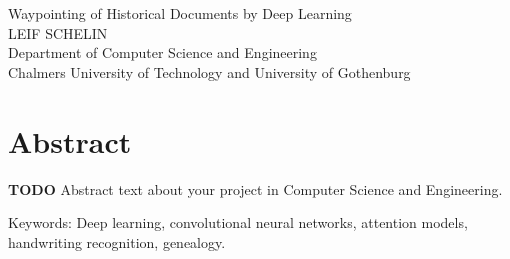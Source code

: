 
Waypointing of Historical Documents by Deep Learning\\
LEIF SCHELIN\\
Department of Computer Science and Engineering\\
Chalmers University of Technology and University of Gothenburg\setlength{\parskip}{0.5cm}

\thispagestyle{plain}			%
\section*{Abstract}
\textbf{TODO}
Abstract text about your project in  Computer Science and Engineering.

\vfill
Keywords: Deep learning, convolutional neural networks, attention models, handwriting recognition, genealogy.

\newpage				%
\thispagestyle{empty}
\mbox{}
